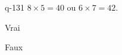 \begin{truefalse}{q-131}
$8\times 5 = 40$ ou $6\times 7 = 42$.
\item* Vrai
\item Faux
\end{truefalse}

